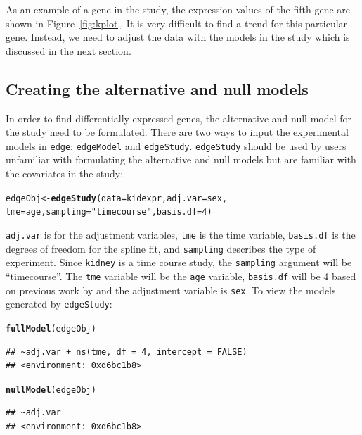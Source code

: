 \documentclass{article}\usepackage[]{graphicx}\usepackage[]{color}
\makeatletter
\newcommand{\hlnum}[1]{\textcolor[rgb]{0.686,0.059,0.569}{#1}}%
\newcommand{\hlstr}[1]{\textcolor[rgb]{0.192,0.494,0.8}{#1}}%
\newcommand{\hlstd}[1]{\textcolor[rgb]{0.345,0.345,0.345}{#1}}%
\newcommand{\hlkwb}[1]{\textcolor[rgb]{0.69,0.353,0.396}{#1}}%
\newcommand{\hlkwc}[1]{\textcolor[rgb]{0.333,0.667,0.333}{#1}}%
\newcommand{\hlkwd}[1]{\textcolor[rgb]{0.737,0.353,0.396}{\textbf{#1}}}%
\newenvironment{kframe}{%
 \def\at@end@of@kframe{}%
 \ifinner\ifhmode%
  \def\at@end@of@kframe{\end{minipage}}%
  \begin{minipage}{\columnwidth}%
 \fi\fi%
 \def\FrameCommand##1{\hskip\@totalleftmargin \hskip-\fboxsep
 \colorbox{shadecolor}{##1}\hskip-\fboxsep
     \hskip-\linewidth \hskip-\@totalleftmargin \hskip\columnwidth}%
 \MakeFramed {\advance\hsize-\width
   \@totalleftmargin\z@ \linewidth\hsize
   \@setminipage}}%
 {\par\unskip\endMakeFramed%
 \at@end@of@kframe}
\newenvironment{knitrout}{}{} %
\makeatother
\begin{document}
As an example of a gene in the study, the expression values of the fifth gene are shown in Figure~\ref{fig:kplot}. It is very difficult to find a trend for this particular gene. Instead, we need to adjust the data with the models in the study which is discussed in the next section.

\subsection{Creating the alternative and null models}
In order to find differentially expressed genes, the alternative and null model for the study need to be formulated. There are two ways to input the experimental models in {\tt edge}: {\tt edgeModel} and {\tt edgeStudy}. {\tt edgeStudy} should be used by users unfamiliar with formulating the alternative and null models but are familiar with the covariates in the study: 
\begin{knitrout}
\color{fgcolor}\begin{kframe}
\begin{alltt}
\hlstd{edgeObj} \hlkwb{<-} \hlkwd{edgeStudy}\hlstd{(}\hlkwc{data} \hlstd{= kidexpr,} \hlkwc{adj.var} \hlstd{= sex,}
    \hlkwc{tme} \hlstd{= age,} \hlkwc{sampling} \hlstd{=} \hlstr{"timecourse"}\hlstd{,} \hlkwc{basis.df} \hlstd{=} \hlnum{4}\hlstd{)}
\end{alltt}
\end{kframe}
\end{knitrout}

{\tt adj.var} is for the adjustment variables, {\tt tme} is the time variable, {\tt basis.df} is the degrees of freedom for the spline fit, and {\tt sampling} describes the type of experiment. Since {\tt kidney} is a time course study, the {\tt sampling} argument will be ``timecourse''. The {\tt tme} variable will be the {\tt age} variable, {\tt basis.df} will be 4 based on previous work by \cite{storey:2005} and the adjustment variable is {\tt sex}. To view the models generated by {\tt edgeStudy}:

\begin{knitrout}
\color{fgcolor}\begin{kframe}
\begin{alltt}
\hlkwd{fullModel}\hlstd{(edgeObj)}
\end{alltt}
\begin{verbatim}
## ~adj.var + ns(tme, df = 4, intercept = FALSE)
## <environment: 0xd6bc1b8>
\end{verbatim}
\begin{alltt}
\hlkwd{nullModel}\hlstd{(edgeObj)}
\end{alltt}
\begin{verbatim}
## ~adj.var
## <environment: 0xd6bc1b8>
\end{verbatim}
\end{kframe}
\end{knitrout}
\end{document}
